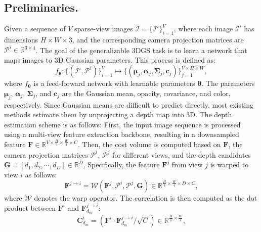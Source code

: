 \subsection{Preliminaries.}
%
Given a sequence of $V$ sparse-view images $\mathcal{I} = \{ {\mathcal I}^{i}\}_{i=1}^{V}$, where each image ${\mathcal I}^i$ has dimensions $H \times W \times 3$, and the corresponding camera projection matrices are ${\mathcal P}^i \in \mathbb{R}^{3 \times 4}$.
%
The goal of the generalizable 3DGS task is to learn a network that maps images to 3D Gaussian parameters. This process is defined as:
%
\begin{equation}
\label{eq:eq1}
    f_{\bm \theta}: \{ ({\mathcal I}^{i}, {\mathcal P}^i) \}_{i=1}^{V} \mapsto \{ (\bm{\mu}_j, \bm{\alpha}_j, \bm{\Sigma}_j, \bm{c}_j ) \}_{j=1}^{V \times H \times W},
\end{equation}
%
where $f_{\bm \theta}$ is a feed-forward network with learnable parameters ${\bm \theta}$.
%
The parameters $\bm{\mu}_j$, $\bm{\alpha}_j$, $\bm{\Sigma}_j$, and $\bm{c}_j$ are the Gaussian mean, opacity, covariance, and color, respectively.
%
%
Since Gaussian means are difficult to predict directly, most existing methods estimate them by unprojecting a depth map into 3D.
%
The depth estimation scheme is as follows:
%
First, the input image sequence is processed using a multi-view feature extraction backbone, resulting in a downsampled feature $\bm F \in \mathbb{R}^{V \times \frac{H}{4} \times \frac{W}{4} \times C}$.
%
%
Then, the cost volume is computed based on $\bm{F}$, the camera projection matrices ${\mathcal{P}}^i$, ${\mathcal{P}}^j$ for different views, and the depth candidates ${\bm{G}} = [d_1, d_2, \cdots, d_D] \in \mathbb{R}^{D}$.
%
Specifically, the feature ${\bm F}^j$ from view $j$ is warped to view $i$ as follows:
%
\begin{equation}
\label{eq:warp_ori}
    {\bm F}^{j \to i} = \mathcal{W}({\bm F}^j, {\mathcal P}^i, {\mathcal P}^j, \bm G) \in \mathbb{R}^{\frac{H}{4} \times \frac{W}{4}  \times D\times C},
\end{equation}
%
where $\mathcal{W}$ denotes the warp operator. The correlation is then computed as the dot product between $\bm{F}^{i}$ and $\bm{F}^{j \to i}_{d_m}$:
%
%
\begin{equation}
\label{eq:correlation}
    {\bm C}_{d_m}^{i} = ({\bm F}^i \cdot {\bm F}^{j \to i}_{d_m} / \sqrt{C}) \in \mathbb{R}^{\frac{H}{4} \times \frac{W}{4}},
\end{equation}
